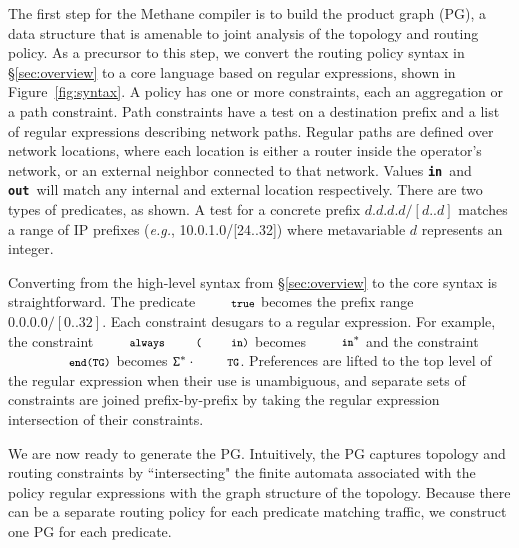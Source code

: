 \documentclass[numbers, 10pt, preprint]{sigplanconf}
\newcommand{\EG}{\emph{e.g.}}
\newcommand{\sysname}{{\small \sf Methane}\xspace}
\newcommand{\CD}[1]{\texttt{\small #1}}  %
\newcommand{\KW}[1]{\texttt{\small\bfseries{#1}}}
\newcommand{\True}{\CD{true}}
\newcommand{\Prefer}{\texttt{>>}}
\newcommand{\Path}{\texttt{=>}}
\newcommand{\In}{\KW{in}}
\newcommand{\Out}{\KW{out}}
\newcommand{\Exit}{\KW{exit}}
\newcommand{\End}{\KW{end}}
\newcommand{\Always}{\KW{always}}
\begin{document}
The first step for the \sysname compiler is to build the product graph (PG), a data structure that is amenable to joint analysis of the topology and routing policy. As a precursor to this step, we convert the routing policy syntax in \S\ref{sec:overview} to a core language based on regular expressions, shown in Figure~\ref{fig:syntax}.
%
A policy has one or more constraints, each an aggregation or a path constraint. Path constraints have a test on a destination prefix and a list of regular expressions describing network paths. Regular paths are defined over network locations, where each location is either a router inside the operator's network, or an external neighbor connected to that network. Values \In\ and \Out\ will match any internal and external location respectively. There are two types of predicates, as shown. A test for a concrete prefix $d.d.d.d/[d..d]$ matches a range of IP prefixes (\EG, 10.0.1.0/[24..32]) where metavariable $d$ represents an integer.

Converting from the high-level syntax from \S\ref{sec:overview} to the core syntax is straightforward. The predicate $\True$ becomes the prefix range $0.0.0.0/[0..32]$.
%
Each constraint desugars to a regular expression. For example, the constraint $\Always\CD{(\In)}$ becomes $\In^*$ and the constraint $\CD{\End(TG)}$ becomes $\mathtt{\Sigma}^* \cdot \CD{TG}$.
%
Preferences are lifted to the top level of the regular expression when their use is unambiguous, and separate sets of constraints are joined prefix-by-prefix by taking the regular expression intersection of their constraints.

%
%

We are now ready to generate the PG. Intuitively, the PG captures topology and routing constraints by ``intersecting" the finite automata associated with the policy regular expressions with the graph structure of the topology.
%
%
Because there can be a separate routing policy for each predicate matching traffic, we construct one PG for each predicate.
\end{document}
